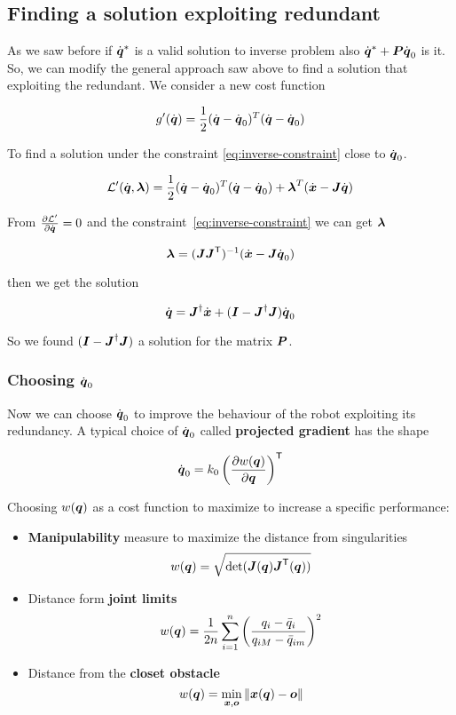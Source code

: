 \subsection{Finding a solution exploiting redundant}

As we saw before if $\dot{\boldsymbol{q}}^*$ is a valid solution to inverse problem also $\dot{\boldsymbol{q}}^* + \boldsymbol{P}\dot{\boldsymbol{q}}_0$ is it.
So, we can modify the general approach saw above to find a solution that exploiting the redundant.
We consider a new cost function

\[ g'(\dot{\boldsymbol{q}}) = \frac{1}{2} (\dot{\boldsymbol{q}} - \dot{\boldsymbol{q}}_0)^T (\dot{\boldsymbol{q}} - \dot{\boldsymbol{q}}_0) \]

To find a solution under the constraint \ref{eq:inverse-constraint} close to $\dot{\boldsymbol{q}}_0$.

\[ \mathcal{L}'(\dot{\boldsymbol{q}}, \boldsymbol{\lambda}) = \frac{1}{2} (\dot{\boldsymbol{q}} - \dot{\boldsymbol{q}}_0)^T (\dot{\boldsymbol{q}} - \dot{\boldsymbol{q}}_0) + \boldsymbol{\lambda}^T (\dot{\boldsymbol{x}} - \boldsymbol{J} \dot{\boldsymbol{q}}) \]

From $\frac{\partial \mathcal{L}'}{\partial \dot{\boldsymbol{q}}} = 0$ and the constraint~\ref{eq:inverse-constraint} we can get $\boldsymbol{\lambda}$

\[\boldsymbol{\lambda} = (\boldsymbol{J}\boldsymbol{J}^{\mathsf{T}})^{-1} (\dot{\boldsymbol{x}} - \boldsymbol{J}\dot{\boldsymbol{q}}_0)\]

then we get the solution

\begin{equation}
    \dot{\boldsymbol{q}} = \boldsymbol{J}^\dag \dot{\boldsymbol{x}} + (\boldsymbol{I} - \boldsymbol{J}^\dag \boldsymbol{J}) \dot{\boldsymbol{q}}_0\label{eq:solution-null-space-method-redundancy}
\end{equation}

So we found $(\boldsymbol{I} - \boldsymbol{J}^\dag \boldsymbol{J})$ a solution for the matrix $\boldsymbol{P}$.

\subsubsection{Choosing $\dot{\boldsymbol{q}}_0$}

Now we can choose $\dot{\boldsymbol{q}}_0$ to improve the behaviour of the robot exploiting its redundancy.
A typical choice of $\dot{\boldsymbol{q}}_0$ called \textbf{projected gradient} has the shape

\[ \dot{\boldsymbol{q}}_0 = k_0 \left(\frac{\partial w(\boldsymbol{q})}{\partial \boldsymbol{q}}\right)^{\mathsf{T}} \]

Choosing $w(\boldsymbol{q})$ as a cost function to maximize to increase a specific performance:

\begin{itemize}
	\item \textbf{Manipulability} measure to maximize the distance from singularities
	\[ w(\boldsymbol{q}) = \sqrt{\det(\boldsymbol{J}(\boldsymbol{q})\boldsymbol{J}^{\mathsf{T}}(\boldsymbol{q}))} \]

	\item Distance form \textbf{joint limits}
	\[ w(\boldsymbol{q}) = \frac{1}{2n} \sum_{i=1}^{n} \left( \frac{q_i - \bar{q}_i}{q_{iM} - \bar{q}_{im}} \right)^2 \]

	\item Distance from the \textbf{closet obstacle}
	\[ w(\boldsymbol{q}) = \min_{\boldsymbol{x},\boldsymbol{o}}\left\lVert\boldsymbol{x}(\boldsymbol{q})-\boldsymbol{o}\right\rVert \]
\end{itemize}

